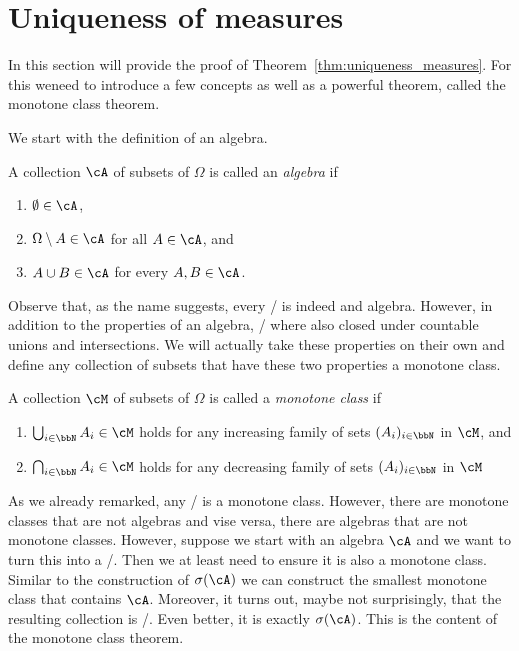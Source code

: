 
\section{Uniqueness of measures}

In this section will provide the proof of Theorem~\ref{thm:uniqueness_measures}. For this weneed to introduce a few concepts as well as a powerful theorem, called the monotone class theorem.

We start with the definition of an algebra.

\begin{definition}
A collection $\cA$ of subsets of $\Omega$ is called an \emph{algebra} if
\begin{enumerate}
\item $\emptyset \in \cA$,
\item $\Omega \setminus A \in \cA$ for all $A \in \cA$, and
\item $A \cup B \in \cA$ for every $A, B \in \cA$.
\end{enumerate}
\end{definition}

Observe that, as the name suggests, every \sigalg/ is indeed and algebra. However, in addition to the properties of an algebra, \sigalgs/ where also closed under countable unions and intersections. We will actually take these properties on their own and define any collection of subsets that have these two properties a monotone class.

\begin{definition}
A collection $\cM$ of subsets of $\Omega$ is called a \emph{monotone class} if
\begin{enumerate}
\item $\bigcup_{i \in \bbN} A_i \in \cM$ holds for any increasing family of sets $(A_i)_{i \in \bbN}$ in $\cM$, and
\item $\bigcap_{i \in \bbN} A_i \in \cM$ holds for any decreasing family of sets $(A_i)_{i \in \bbN}$ in $\cM$
\end{enumerate}
\end{definition}

As we already remarked, any \sigalg/ is a monotone class. However, there are monotone classes that are not algebras and vise versa, there are algebras that are not monotone classes. However, suppose we start with an algebra $\cA$ and we want to turn this into a \sigalg/. Then we at least need to ensure it is also a monotone class. Similar to the construction of $\sigma(\cA)$ we can construct the smallest monotone class that contains $\cA$. Moreover, it turns out, maybe not surprisingly, that the resulting collection is \sigalg/. Even better, it is exactly $\sigma(\cA)$. This is the content of the monotone class theorem. 

